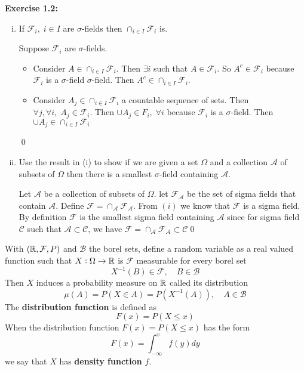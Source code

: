 \textbf{Exercise 1.2:} 
\begin{enumerate}[i)]
    \item If $\mathcal{F}_i, \; i\in I$ are $\sigma$-fields then $\cap_{i \in I}\mathcal{F}_i$ is.
    \begin{mdframed}
        Suppose $\mathcal{F}_i$ are $\sigma$-fields. 
        \begin{itemize}
            \item Consider $A \in \cap_{i \in I}\mathcal{F}_i$. Then $\exists i$ such that $A \in \mathcal{F}_i$. So $A^c \in \mathcal{F}_i$ because $\mathcal{F}_i$ is a $\sigma$-field $\sigma$-field. Then $A^c \in \cap_{i \in I}\mathcal{F}_i$. 
            \item Consider $A_j \in \cap_{i \in I}\mathcal{F}_i$ a countable sequence of sets. Then $\forall j, \forall i, \; A_j \in \mathcal{F}_i$. Then $\cup A_j \in F_i, \; \forall i$ because $\mathcal{F}_i$ is a $\sigma$-field. Then $\cup A_j \in \cap_{i \in I}\mathcal{F}_i$ 
        \end{itemize}\qed
        \end{mdframed}
    \item Use the result in (i) to show if we are given a set $\Omega$ and a collection $\mathcal{A}$ of subsets of $\Omega$ then there is a smallest $\sigma$-field containing $\mathcal{A}$.
    \begin{mdframed}
        Let $\mathcal{A}$ be a collection of subsets of $\Omega$. let $\mathcal{F}_\mathcal{A}$ be the set of sigma fields that contain $\mathcal{A}$. Define $\mathcal{F} = \cap_{\mathcal{A}}\mathcal{F}_\mathcal{A}$. From $(i)$ we know that $\mathcal{F}$ is a sigma field. By definition $\mathcal{F}$ is the smallest sigma field containing $\mathcal{A}$ since for sigma field $\mathcal{C}$ such that $\mathcal{A} \subset \mathcal{C}$, we have $\mathcal{F}=\cap_{\mathcal{A}}\mathcal{F}_\mathcal{A} \subset \mathcal{C}$\qed
    \end{mdframed}
\end{enumerate}

\noindent With $(\mathbb{R}, \mathcal{F}, P)$ and $\mathcal{B}$ the borel sets, define a random variable as a real valued function such that $X: \Omega \to \mathbb{R}$ is $\mathcal{F}$ measurable for every borel set \[X^{-1}(B)\in \mathcal{F}, \quad B \in \mathcal{B}\]
Then $X$ induces a probability measure on $\mathbb{R}$ called its distribution \[\mu(A) = P(X \in A) = P(X^{-1}(A)), \quad A \in \mathcal{B}\]
The \textbf{distribution function} is defined as \[F(x) = P(X \leq x)\]
When the distribution function $F(x) = P(X \leq x)$ has the form \[F(x) = \int_{-\infty}^x f(y)dy\] we say that $X$ has \textbf{density function} $f$.

